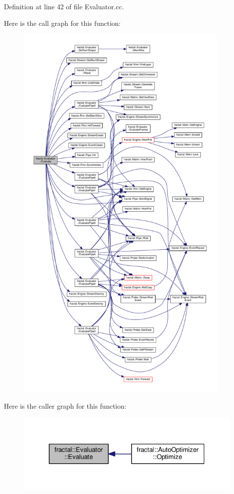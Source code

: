 Definition at line 42 of file Evaluator.\+cc.



Here is the call graph for this function\+:\nopagebreak
\begin{figure}[H]
\begin{center}
\leavevmode
\includegraphics[height=550pt]{d2/d13/classfractal_1_1Evaluator_a66e573448393210cf678e564d0595879_cgraph}
\end{center}
\end{figure}




Here is the caller graph for this function\+:\nopagebreak
\begin{figure}[H]
\begin{center}
\leavevmode
\includegraphics[width=319pt]{d2/d13/classfractal_1_1Evaluator_a66e573448393210cf678e564d0595879_icgraph}
\end{center}
\end{figure}



